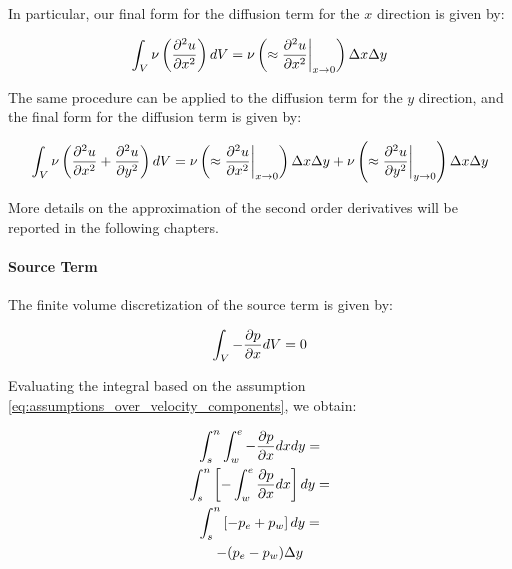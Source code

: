 In particular, our final form for the diffusion term for the $x$ direction is given by:

\begin{equation}
    \int_{V} \nu \left( \frac{\partial^2 u}{\partial x^2} \right) \space dV = \nu \left( \approx \frac{\partial^2 u}{\partial x^2} \bigg|_{x \to 0} \right) \Delta x \Delta y
\end{equation}

The same procedure can be applied to the diffusion term for the $y$ direction, and the final form for the diffusion term is given by:

\begin{equation}
    \int_{V} \nu \left( \frac{\partial^2 u}{\partial x^2} + \frac{\partial^2 u}{\partial y^2} \right) \space dV = \nu \left( \approx \frac{\partial^2 u}{\partial x^2} \bigg|_{x \to 0} \right) \Delta x \Delta y + \nu \left( \approx \frac{\partial^2 u}{\partial y^2} \bigg|_{y \to 0} \right) \Delta x \Delta y
    \label{eq:INS_steady_2D_discretized_diffusion}
\end{equation}

More details on the approximation of the second order derivatives will be reported in the following chapters.



%
%
\paragraph{Source Term}

The finite volume discretization of the source term is given by:

\begin{equation}
    \int_{V} - \frac{\partial p}{\partial x} \space dV = 0
\end{equation}

Evaluating the integral based on the assumption \ref{eq:assumptions_over_velocity_components}, we obtain:

\begin{gather}
    \int_{s}^{n} \int_{w}^{e} - \frac{\partial p}{\partial x} \space dxdy = \\
    \int_{s}^{n} \left[ - \int_{w}^{e} \frac{\partial p}{\partial x} \space dx \right] dy = \\
    \int_{s}^{n} \left[ - p_e + p_w \right] dy = \\
    - (p_e - p_w) \Delta y
\end{gather}



